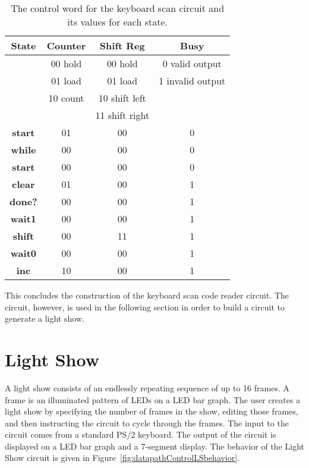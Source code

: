 \begin{table}
\begin{tabular}{c||c|c|c}  
\textbf{ State }  & Counter	& Shift Reg	&  Busy  		\\ \hline
        & 00 hold	& 00 hold	& 0 valid output	\\ \hline
        & 01 load	& 01 load	& 1 invalid output	\\ \hline
        & 10 count	& 10 shift left	& 			\\ \hline
        &      		& 11 shift right&			\\ \hline \hline
\textbf{ start }	&	01	&	00	&	0	\\ \hline
\textbf{ while }	&	00	&	00	&	0	\\ \hline
\textbf{ start }	&	00	&	00	&	0	\\ \hline
\textbf{ clear }	&	01	&	00	&	1	\\ \hline
\textbf{ done? }	&	00	&	00	&	1	\\ \hline
\textbf{ wait1 }	&	00	&	00	&	1	\\ \hline
\textbf{ shift }	&	00	&	11	&	1	\\ \hline
\textbf{ wait0 }	&	00	&	00	&	1	\\ \hline
\textbf{ inc }	&	10	&	00	&	1	\\ 
\end{tabular}
\caption{The control word for the keyboard scan circuit and its values for each state.}
\label{table:kscan}
\end{table}

This concludes the construction of the keyboard scan code reader circuit.
The circuit, however, is used in the following section in order to build a
circuit to generate a light show.


\pagebreak
\section{Light Show}

A light show consists of an endlessly repeating sequence of up to 16 frames. 
A frame is an illuminated pattern of LEDs on a LED bar graph. The user 
creates a light show by specifying the number of frames in the show, editing 
those frames, and then instructing the circuit to cycle through the frames. 
The input to the circuit comes from a standard PS/2 keyboard. The output of 
the circuit is displayed on a LED bar graph and a 7-segment display. The 
behavior of the Light Show circuit is given in Figure~\ref{fig:datapathControlLSbehavior}.
 
